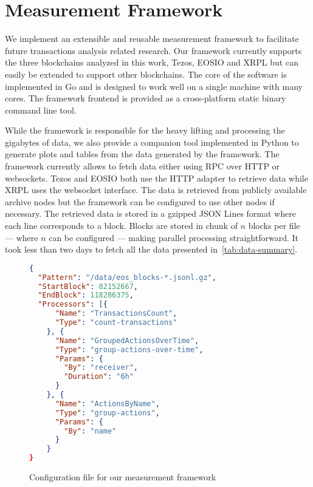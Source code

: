 \section{Measurement Framework}
We implement an extensible and reusable measurement framework to facilitate future transactions analysis related research.
Our framework currently supports the three blockchains analyzed in this work, Tezos, EOSIO and XRPL but can easily be extended to support other blockchains.
The core of the software is implemented in Go and is designed to work well on a single machine with many cores.
The framework frontend is provided as a cross-platform static binary command line tool.

While the framework is responsible for the heavy lifting and processing the gigabytes of data, we also provide a companion tool implemented in Python to generate plots and tables from the data generated by the framework.
The framework currently allows to fetch data either using RPC over HTTP or websockets.
Tezos and EOSIO both use the HTTP adapter to retrieve data while XRPL uses the websocket interface.
The data is retrieved from publicly available archive nodes but the framework can be configured to use other nodes if necessary.
The retrieved data is stored in a gzipped JSON Lines format where each line corresponds to a block. Blocks are stored in chunk of $n$ blocks per file --- where $n$ can be configured --- making parallel processing straightforward. It took less than two days to fetch all the data presented in~\autoref{tab:data-summary}.

\begin{figure}[h!]
\begin{lstlisting}[language=json]
{
  "Pattern": "/data/eos_blocks-*.jsonl.gz",
  "StartBlock": 82152667,
  "EndBlock": 118286375,
  "Processors": [{
      "Name": "TransactionsCount",
      "Type": "count-transactions"
    }, {
      "Name": "GroupedActionsOverTime",
      "Type": "group-actions-over-time",
      "Params": {
        "By": "receiver",
        "Duration": "6h"
      }
    }, {
      "Name": "ActionsByName",
      "Type": "group-actions",
      "Params": {
        "By": "name"
      }
    }
}
\end{lstlisting}
  \caption{Configuration file for our measurement framework}
  \label{lis:framework-config}
\end{figure}

